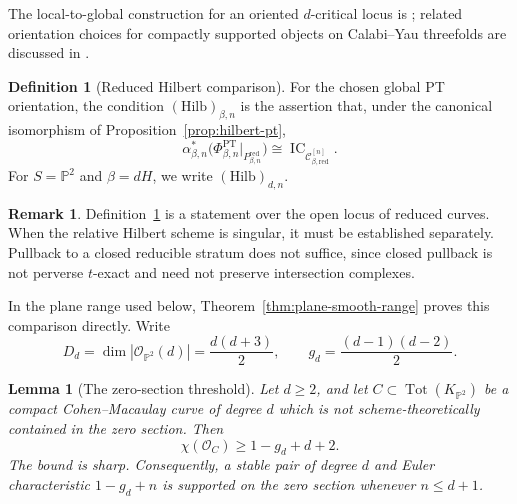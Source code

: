 \documentclass[11pt,reqno]{amsart}
\newtheorem{lemma}[theorem]{Lemma}
\theoremstyle{definition}
\newtheorem{definition}[theorem]{Definition}
\newtheorem{remark}[theorem]{Remark}
\newcommand{\Pp}{\mathbb P}
\newcommand{\Ocal}{\mathcal O}
\newcommand{\IC}{\operatorname{IC}}
\newcommand{\Tot}{\operatorname{Tot}}
\newcommand{\PT}{\operatorname{PT}}
\newcommand{\red}{\mathrm{red}}
\begin{document}
The local-to-global construction for an oriented $d$-critical locus is
\cite[Theorem~6.9]{BBDJS}; related orientation choices for compactly
supported objects on Calabi--Yau threefolds are discussed in
\cite{JoyceUpmeier}.

\begin{definition}[Reduced Hilbert comparison]
\label{def:reduced-hilbert-comparison}
For the chosen global PT orientation, the condition
$(\mathrm{Hilb})_{\beta,n}$ is the assertion that, under the canonical
isomorphism of Proposition~\ref{prop:hilbert-pt},
\[
  \alpha_{\beta,n}^*
  \bigl(\Phi_{\beta,n}^{\PT}|_{P_{\beta,n}^{\red}}\bigr)
  \cong
  \IC_{\mathcal C_{\beta,\red}^{[n]}}.
\]
For $S=\Pp^2$ and $\beta=dH$, we write $(\mathrm{Hilb})_{d,n}$.
\end{definition}

\begin{remark}
Definition~\ref{def:reduced-hilbert-comparison} is a statement over the open locus
of reduced curves.  When the relative Hilbert scheme is singular, it must be
established separately.  Pullback to a closed reducible stratum does not
suffice, since closed pullback is not perverse $t$-exact and need not
preserve intersection complexes.
\end{remark}

In the plane range used below,
Theorem~\ref{thm:plane-smooth-range} proves this comparison directly.
Write
\[
  D_d=\dim|\Ocal_{\Pp^2}(d)|=\frac{d(d+3)}2,
  \qquad
  g_d=\frac{(d-1)(d-2)}2.
\]

\begin{lemma}[The zero-section threshold]\label{lem:zero-section-threshold}
Let $d\ge2$, and let $C\subset\Tot(K_{\Pp^2})$ be a compact
Cohen--Macaulay curve of degree $d$ which is not scheme-theoretically
contained in the zero section.
Then
\[
  \chi(\Ocal_C)\ge 1-g_d+d+2.
\]
The bound is sharp.  Consequently, a stable pair of degree $d$ and Euler
characteristic $1-g_d+n$ is supported on the zero section whenever
$n\le d+1$.
\end{lemma}
\end{document}
